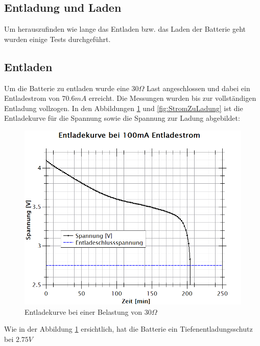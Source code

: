 \subsection{Entladung und Laden}

Um herauszufinden wie lange das Entladen bzw. das Laden der Batterie geht wurden einige Tests durchgeführt.

\subsection*{Entladen}
Um die Batterie zu entladen wurde eine $30\Omega$ Last angeschlossen und dabei ein Entladestrom von $70.6mA$ erreicht. Die Messungen wurden bis zur vollständigen Entladung vollzogen. 
In den Abbildungen \ref{fig:EntladekurveSpannung} und  \ref{fig:StromZuLadung} ist die Entladekurve für die Spannung sowie die Spannung zur Ladung abgebildet:

\begin{figure}[h]
	\centering
	\includegraphics[width=\textwidth]{graphics/SpannungzuZeit.png}
	\caption{Entladekurve bei einer Belastung von 30$\Omega$}
	\label{fig:EntladekurveSpannung}
\end{figure}

Wie in der Abbildung \ref{fig:EntladekurveSpannung} ersichtlich, hat die Batterie ein Tiefenentladungsschutz bei $2.75V$

